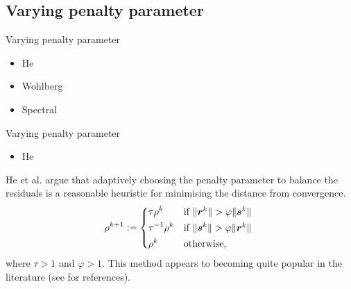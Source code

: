 \documentclass[8pt,red]{beamer}
\theoremstyle{plain}
\theoremstyle{definition}
\theoremstyle{remark}
\newcommand{\bi}[1]{\ensuremath{\boldsymbol{#1}}}
\begin{document}
\subsection{Varying penalty parameter}

\begin{frame}{Varying penalty parameter}
\begin{itemize}
\item He
\item Wohlberg
\item Spectral
\end{itemize}
\end{frame}

\begin{frame}{Varying penalty parameter}
\begin{itemize}
\item He
\end{itemize}
He et al. \citep{He2000} argue that adaptively choosing the penalty parameter to balance the residuals is a reasonable heuristic for minimising the distance from convergence.
\begin{align}
  \rho^{k+1} := 
  \begin{dcases*}
	\tau \rho^{k}
    & if $ \| \bi{r}^{k} \| > \varphi \| \bi{s}^{k} \|$ \\
    \tau^{-1} \rho^{k}
    & if $ \| \bi{s}^{k} \| > \varphi \| \bi{r}^{k} \|$ \\
    \rho^{k}
    & otherwise, \\
  \end{dcases*}  
\end{align}
where $\tau > 1$ and $\varphi > 1$. This method appears to becoming quite popular in the literature (see \citep{wohlberg2017admm} for references).
\end{frame}
\end{document}
